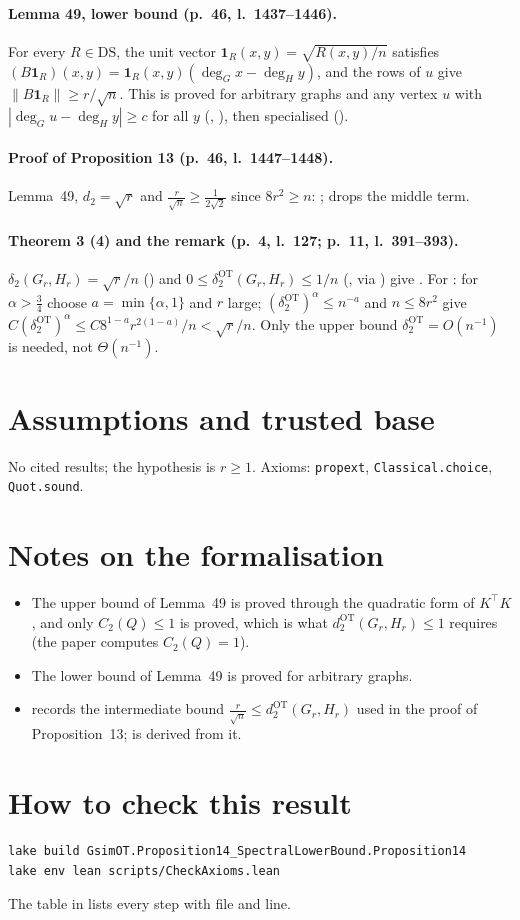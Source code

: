 \paragraph{Lemma 49, lower bound (p.~46, l.~1437--1446).} For every $R\in\mathrm{DS}$, the unit vector
$\mathbf 1_R(x,y)=\sqrt{R(x,y)/n}$ satisfies $(B\mathbf 1_R)(x,y)=\mathbf 1_R(x,y)(\deg_G x-\deg_H y)$, and the rows
of $u$ give $\|B\mathbf 1_R\|\ge r/\sqrt n$. This is proved for arbitrary graphs and any vertex $u$ with
$|\deg_G u-\deg_H y|\ge c$ for all $y$ (, ), then specialised
().

\paragraph{Proof of Proposition 13 (p.~46, l.~1447--1448).} Lemma~49, $d_2=\sqrt r$ and $\frac r{\sqrt n}\ge
\frac1{2\sqrt2}$ since $8r^2\ge n$: ;  drops the middle term.

\paragraph{Theorem 3 (4) and the remark (p.~4, l.~127; p.~11, l.~391--393).} $\delta_2(G_r,H_r)=\sqrt r/n$
() and $0\le\delta^{\mathrm{OT}}_2(G_r,H_r)\le1/n$ (, via
) give . For : for $\alpha>\frac34$ choose
$a=\min\{\alpha,1\}$ and $r$ large; $(\delta^{\mathrm{OT}}_2)^\alpha\le n^{-a}$ and $n\le8r^2$ give
$C(\delta^{\mathrm{OT}}_2)^\alpha\le C8^{1-a}r^{2(1-a)}/n<\sqrt r/n$. Only the upper bound
$\delta^{\mathrm{OT}}_2=O(n^{-1})$ is needed, not $\Theta(n^{-1})$.

\section{Assumptions and trusted base}
No cited results; the hypothesis is $r\ge1$. Axioms: \texttt{propext}, \texttt{Classical.choice},
\texttt{Quot.sound}.

\section{Notes on the formalisation}
\begin{itemize}
\item The upper bound of Lemma~49 is proved through the quadratic form of $K^\top K$, and only $C_2(Q)\le1$ is
  proved, which is what $d^{\mathrm{OT}}_2(G_r,H_r)\le1$ requires (the paper computes $C_2(Q)=1$).
\item The lower bound of Lemma~49 is proved for arbitrary graphs.
\item {} records the intermediate bound $\frac r{\sqrt n}\le d^{\mathrm{OT}}_2(G_r,H_r)$ used in the
  proof of Proposition~13;  is derived from it.
\end{itemize}

\section{How to check this result}
\begin{verbatim}
lake build GsimOT.Proposition14_SpectralLowerBound.Proposition14
lake env lean scripts/CheckAxioms.lean
\end{verbatim}
The table in  lists every step with file and line.

